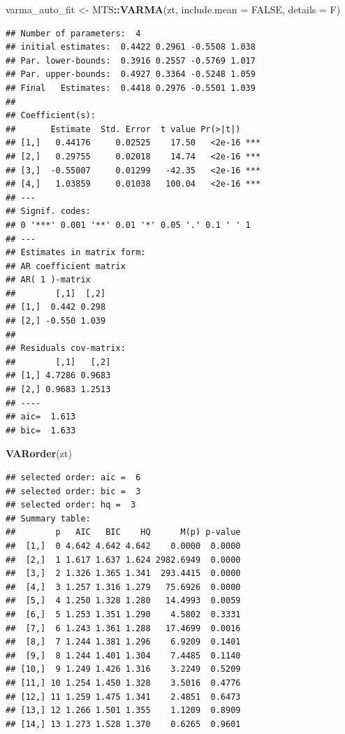 \documentclass[]{book}
\newenvironment{Shaded}{\begin{snugshade}}{\end{snugshade}}
\newcommand{\DataTypeTok}[1]{\textcolor[rgb]{0.13,0.29,0.53}{#1}}
\newcommand{\KeywordTok}[1]{\textcolor[rgb]{0.13,0.29,0.53}{\textbf{#1}}}
\newcommand{\NormalTok}[1]{#1}
\newcommand{\OperatorTok}[1]{\textcolor[rgb]{0.81,0.36,0.00}{\textbf{#1}}}
\newcommand{\OtherTok}[1]{\textcolor[rgb]{0.56,0.35,0.01}{#1}}
\newcommand{\StringTok}[1]{\textcolor[rgb]{0.31,0.60,0.02}{#1}}
\begin{document}
\begin{Shaded}
\begin{Highlighting}[]
\NormalTok{varma_auto_fit <-}\StringTok{ }\NormalTok{MTS}\OperatorTok{::}\KeywordTok{VARMA}\NormalTok{(zt, }\DataTypeTok{include.mean =} \OtherTok{FALSE}\NormalTok{, }\DataTypeTok{details =}\NormalTok{ F)}
\end{Highlighting}
\end{Shaded}

\begin{verbatim}
## Number of parameters:  4 
## initial estimates:  0.4422 0.2961 -0.5508 1.038 
## Par. lower-bounds:  0.3916 0.2557 -0.5769 1.017 
## Par. upper-bounds:  0.4927 0.3364 -0.5248 1.059 
## Final   Estimates:  0.4418 0.2976 -0.5501 1.039 
## 
## Coefficient(s):
##       Estimate  Std. Error  t value Pr(>|t|)    
## [1,]   0.44176     0.02525    17.50   <2e-16 ***
## [2,]   0.29755     0.02018    14.74   <2e-16 ***
## [3,]  -0.55007     0.01299   -42.35   <2e-16 ***
## [4,]   1.03859     0.01038   100.04   <2e-16 ***
## ---
## Signif. codes:  
## 0 '***' 0.001 '**' 0.01 '*' 0.05 '.' 0.1 ' ' 1
## --- 
## Estimates in matrix form: 
## AR coefficient matrix 
## AR( 1 )-matrix 
##        [,1]  [,2]
## [1,]  0.442 0.298
## [2,] -0.550 1.039
##   
## Residuals cov-matrix: 
##        [,1]   [,2]
## [1,] 4.7286 0.9683
## [2,] 0.9683 1.2513
## ---- 
## aic=  1.613 
## bic=  1.633
\end{verbatim}

\begin{Shaded}
\begin{Highlighting}[]
\KeywordTok{VARorder}\NormalTok{(zt)}
\end{Highlighting}
\end{Shaded}

\begin{verbatim}
## selected order: aic =  6 
## selected order: bic =  3 
## selected order: hq =  3 
## Summary table:  
##        p   AIC   BIC    HQ      M(p) p-value
##  [1,]  0 4.642 4.642 4.642    0.0000  0.0000
##  [2,]  1 1.617 1.637 1.624 2982.6949  0.0000
##  [3,]  2 1.326 1.365 1.341  293.4415  0.0000
##  [4,]  3 1.257 1.316 1.279   75.6926  0.0000
##  [5,]  4 1.250 1.328 1.280   14.4993  0.0059
##  [6,]  5 1.253 1.351 1.290    4.5802  0.3331
##  [7,]  6 1.243 1.361 1.288   17.4699  0.0016
##  [8,]  7 1.244 1.381 1.296    6.9209  0.1401
##  [9,]  8 1.244 1.401 1.304    7.4485  0.1140
## [10,]  9 1.249 1.426 1.316    3.2249  0.5209
## [11,] 10 1.254 1.450 1.328    3.5016  0.4776
## [12,] 11 1.259 1.475 1.341    2.4851  0.6473
## [13,] 12 1.266 1.501 1.355    1.1209  0.8909
## [14,] 13 1.273 1.528 1.370    0.6265  0.9601
\end{verbatim}
\end{document}
